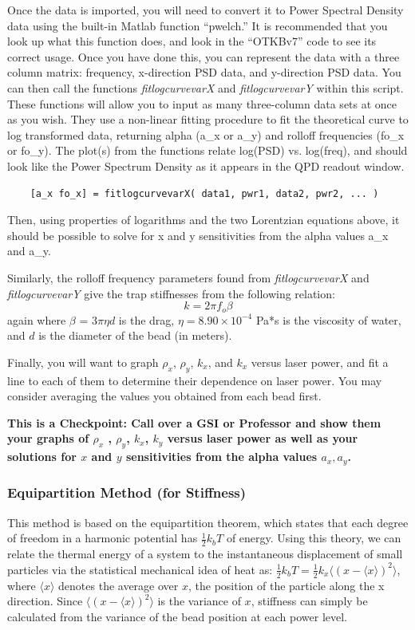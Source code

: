 \documentclass{../lab}
\begin{document}
Once the data is imported, you will need to convert it to Power Spectral Density data using the built-in Matlab function ``pwelch.'' It is recommended that you look up what this function does, and look in the ``OTKBv7'' code to see its correct usage. Once you have done this, you can represent the data with a three column matrix: frequency, x-direction PSD data, and y-direction PSD data. You can then call the functions \emph{fitlogcurvevarX} and \emph{fitlogcurvevarY} within this script. These functions will allow you to input as many three-column data sets at once as you wish. They use a non-linear fitting procedure to fit the theoretical curve to log transformed data, returning alpha (a\_x or a\_y) and rolloff frequencies (fo\_x or fo\_y). The plot(s) from the functions relate log(PSD) vs. log(freq), and should look like the Power Spectrum Density as it appears in the QPD readout window.
\begin{verbatim}
    [a_x fo_x] = fitlogcurvevarX( data1, pwr1, data2, pwr2, ... )
\end{verbatim}
Then, using properties of logarithms and the two Lorentzian equations above, it should be possible to solve for x and y sensitivities from the alpha values a\_x and a\_y.

Similarly, the rolloff frequency parameters found from \emph{fitlogcurvevarX} and \emph{fitlogcurvevarY} give the trap stiffnesses from the following relation:
\[
    k = 2 \pi f_o \beta
\]
again where $\beta$ = $3\pi\eta d$  is the drag, $\eta = 8.90 \times 10^{-4}$ Pa*s is the viscosity of water, and $d$ is the diameter of the bead (in meters).

Finally, you will want to graph $\rho_x$, $\rho_y$, $k_x$, and $k_x$ versus laser power, and fit a line to each of them to determine their dependence on laser power. You may consider averaging the values you obtained from each bead first.

\textbf{This is a Checkpoint: Call over a GSI or Professor and show them your graphs of $\rho_x$ , $\rho_y$, $k_x$, $k_y$ versus laser power as well as your solutions for $x$ and $y$ sensitivities from the alpha values $a_x, a_y$.}

\subsubsection{Equipartition Method (for Stiffness)}

This method is based on the equipartition theorem, which states that each degree of freedom in a harmonic potential has $\frac{1}{2}k_bT $ of energy. Using this theory, we can relate the thermal energy of a system to the instantaneous displacement of small particles via the statistical mechanical idea of heat as: $  \frac{1}{2}k_b T = \frac{1}{2}k_x \langle(x-\langle x\rangle)^2\rangle $, where $\langle x\rangle $ denotes the average over $x$, the position of the particle along the x direction. Since $\langle(x-\langle x\rangle)^2\rangle $ is the variance of $x$, stiffness can simply be calculated from the variance of the bead position at each power level.
\end{document}
